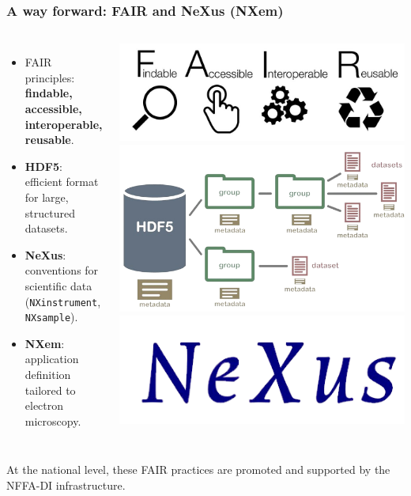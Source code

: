 \documentclass{beamer}
\begin{document}
	\begin{frame}
		\frametitle{A way forward: FAIR and NeXus (NXem)}
		\begin{columns}[T,totalwidth=\textwidth]
			\begin{itemize}
				\item FAIR principles: \textbf{findable, accessible, interoperable, reusable}.
				\item \textbf{HDF5}: efficient format for large, structured datasets.
				\item \textbf{NeXus}: conventions for scientific data (\texttt{NXinstrument}, \texttt{NXsample}).
				\item \textbf{NXem}: application definition tailored to electron microscopy.
			\end{itemize}
			\includegraphics[width=\textwidth]{otherResources/FAIR_data_principles.png}
			\includegraphics[width=\textwidth]{otherResources/HDF5_diagram.png}
			\includegraphics[width=\textwidth]{otherResources/NEXUS_logo.png}
		\end{columns}
		\vspace{0.5em}
		\small At the national level, these FAIR practices are promoted and supported by the NFFA-DI infrastructure.
	\end{frame}
	
\end{document}
